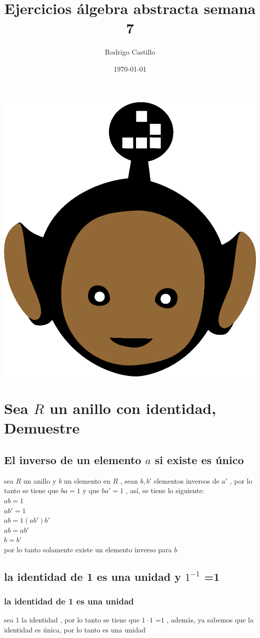 \documentclass[10pt,a4paper]{article} %
\begin{document}
    \title{{  Ejercicios álgebra abstracta semana 7  }}
    \author{{Rodrigo Castillo}}
    \date{\today}

    \maketitle


    \includegraphics[width=0.1\linewidth]{negro_cara.png}
    \section{Sea $ R  $ un anillo con identidad, Demuestre}

        \subsection{El inverso de un elemento $ a  $ si existe es único}

            sea $ R  $ un anillo y $ b  $ un elemento en $ R  $ , sean $ b, b'
            $ elementos inversos de $ a '  $ , por lo tanto se tiene que $
            ba = 1  $ y que $ ba'  = 1 $ , así, se tiene lo siguiente:
            \\
            $ ab = 1  $
            \\
            $ ab' = 1  $
            \\
            $ ab = 1(ab') b' $
            \\
            $ ab = ab'  $
            \\
            $ b = b'  $
            \\
            por lo tanto solamente existe un elemento inverso para $ b  $

        \subsection{la identidad de 1 es una unidad y $ 1 ^{-1}  $  =1  }

            \subsubsection{la identidad de 1 es una unidad}
                sea $ 1  $ la identidad , por lo tanto se tiene que $ 1 \cdot 1
                $ =$ 1  $ , además, ya sabemos que la identidad es única, por
                lo tanto es una unidad
\end{document}
